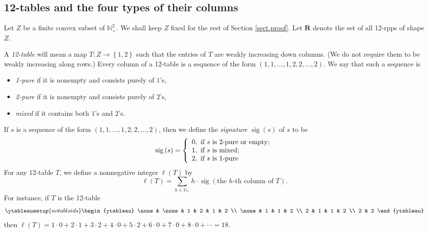 \documentclass[numbers=enddot,12pt,final,onecolumn,notitlepage]{scrartcl}%
\theoremstyle{definition}
\let\sumnonlimits\sum
\renewcommand{\sum}{\sumnonlimits\limits}
\begin{document}
\subsection{\label{subsect.fourtypes}12-tables and the four types of their
columns}

Let $Z$ be a finite convex subset of $\mathbb{N}_{+}^{2}$. We shall keep $Z$
fixed for the rest of Section \ref{sect.proof}. Let $\mathbf{R}$ denote the set
of all 12-rpps of shape $Z$.

A \textit{12-table} will mean a map $T:Z\rightarrow\left\{  1,2\right\}  $
such that the entries of $T$ are weakly increasing down columns. (We do not
require them to be weakly increasing along rows.) Every column of a 12-table
is a sequence of the form $(1,1,\ldots,1,2,2,\ldots,2)$. We say that such a sequence is

\begin{itemize}
\item \textit{1-pure} if it is nonempty and consists purely of $1$'s,

\item \textit{2-pure} if it is nonempty and consists purely of $2$'s,

\item \textit{mixed} if it contains both $1$'s and $2$'s.
\end{itemize}

If $s$ is a sequence of the form $(1,1,\ldots,1,2,2,\ldots,2)$, then we define the
\textit{signature} $\operatorname*{sig}\left(  s\right)
$ of $s$ to be
\[
\operatorname*{sig}\left(  s\right) = \left\{
\begin{array}
[c]{l}%
0,\text{ if }s\text{ is 2-pure or empty;}\\
1,\text{ if }s\text{ is mixed;}\\
2,\text{ if }s\text{ is 1-pure}%
\end{array}
\right.
\]
For any 12-table $T$, we define a nonnegative integer $\ell\left(
T\right)  $ by%
\[
\ell\left(  T\right)  =\sum_{h\in\mathbb{N}_{+}}h\cdot\operatorname*{sig}%
\left(  \text{the }h\text{-th column of }T\right)  .
\]
For instance, if $T$ is the 12-table
\begin{equation}
%
\ytableausetup{notabloids}
\begin{ytableau}
\none& \none& 1 & 2 & 1 & 2 \\
\none& 1 & 1 & 2 \\
2 & 1 & 1 & 2 \\
2 & 2
\end{ytableau}%
\label{eq.example-12-table.1}
\end{equation}
then $\ell\left(  T\right)  =1\cdot0+2\cdot1+3\cdot2+4\cdot0+5\cdot
2+6\cdot0+7\cdot0+8\cdot0+\cdots=18$.
\end{document}
